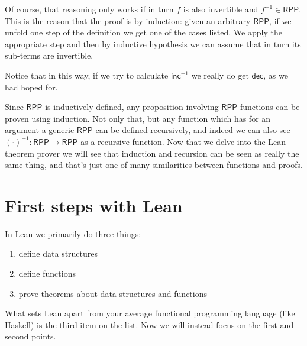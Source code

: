 \documentclass{book}
\theoremstyle{definition}
\theoremstyle{remark}
\theoremstyle{plain}
\newcommand{\RPP}{\mathsf{RPP}}
\newcommand{\rppinc}{\mathsf{inc}}
\newcommand{\rppdec}{\mathsf{dec}}
\begin{document}
Of course, that reasoning only works if in turn $f$ is also invertible and $f^{-1} \in \RPP$.
This is the reason that the proof is by induction:
given an arbitrary $\RPP$, if we unfold one step of the definition we get one of the cases listed.
We apply the appropriate step and then by inductive hypothesis we can assume that in turn its sub-terms are invertible.

Notice that in this way, if we try to calculate $\rppinc^{-1}$ we really do get $\rppdec$, as we had hoped for.

Since $\RPP$ is inductively defined, any proposition involving $\RPP$ functions can be proven using induction.
Not only that, but any function which has for an argument a generic $\RPP$ can be defined recursively,
and indeed we can also see $(\cdot)^{-1}:\RPP \to \RPP$ as a recursive function.
Now that we delve into the Lean theorem prover we will see that induction and recursion can be seen as really the same thing,
and that's just one of many similarities between functions and proofs.

\section{First steps with Lean}

In Lean we primarily do three things:
\begin{enumerate}
\item define data structures
\item define functions
\item prove theorems about data structures and functions
\end{enumerate}
What sets Lean apart from your average functional programming language (like Haskell) is the third item on the list.
Now we will instead focus on the first and second points.
\end{document}
